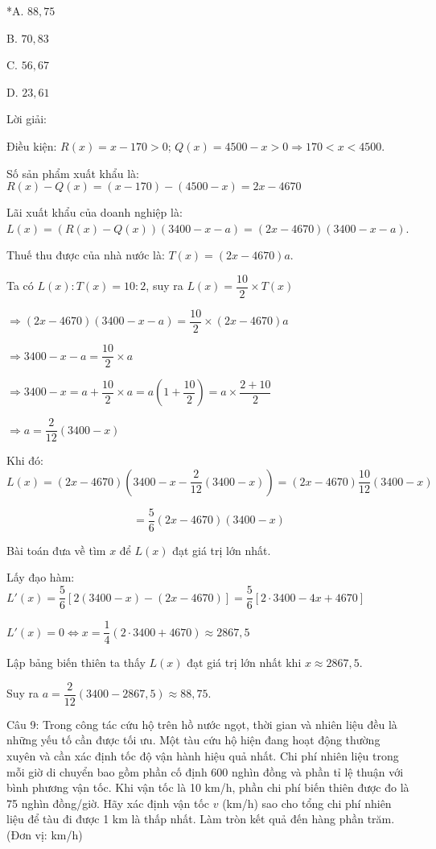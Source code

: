 \documentclass[a4paper,12pt]{article}
\begin{document}
*A. \(88,75\)

B. \(70,83\)

C. \(56,67\)

D. \(23,61\)

Lời giải:


Điều kiện: \(R(x) = x - 170 > 0\); \(Q(x) = 4500 - x > 0 \Rightarrow 170 < x < 4500\).

Số sản phẩm xuất khẩu là: \(R(x) - Q(x) = (x - 170) - (4500 - x) = 2x - 4670\)

Lãi xuất khẩu của doanh nghiệp là: \(L(x) = (R(x) - Q(x))(3400 - x - a) = (2x - 4670)(3400 - x - a)\).

Thuế thu được của nhà nước là: \(T(x) = (2x - 4670)a\).

Ta có \(L(x) : T(x) = 10 : 2\), suy ra \(L(x) = \dfrac{10}{2} \times T(x)\)

\(\Rightarrow (2x - 4670)(3400 - x - a) = \dfrac{10}{2} \times (2x - 4670)a\)

\(\Rightarrow 3400 - x - a = \dfrac{10}{2} \times a\)

\(\Rightarrow 3400 - x = a + \dfrac{10}{2} \times a = a\left(1 + \dfrac{10}{2}\right) = a \times \dfrac{2 + 10}{2}\)

\(\Rightarrow a = \dfrac{2}{12}(3400 - x)\)

Khi đó:
$$L(x) = (2x - 4670)\left(3400 - x - \dfrac{2}{12}(3400 - x)\right) = (2x - 4670) \dfrac{10}{12}(3400 - x)$$

$$= \dfrac{5}{6}(2x - 4670)(3400 - x)$$

Bài toán đưa về tìm \(x\) để \(L(x)\) đạt giá trị lớn nhất.

Lấy đạo hàm: \(L'(x) = \dfrac{5}{6}[2(3400 - x) - (2x - 4670)] = \dfrac{5}{6}[2 \cdot 3400 - 4x + 4670]\)

\(L'(x) = 0 \Leftrightarrow x = \dfrac{1}{4}(2 \cdot 3400 + 4670) \approx 2867,5\)

Lập bảng biến thiên ta thấy \(L(x)\) đạt giá trị lớn nhất khi \(x \approx 2867,5\).

Suy ra \(a = \dfrac{2}{12}(3400 - 2867,5) \approx 88,75\).




Câu 9: Trong công tác cứu hộ trên hồ nước ngọt, thời gian và nhiên liệu đều là những yếu tố cần được tối ưu. Một tàu cứu hộ hiện đang hoạt động thường xuyên và cần xác định tốc độ vận hành hiệu quả nhất. Chi phí nhiên liệu trong mỗi giờ di chuyển bao gồm phần cố định 600 nghìn đồng và phần tỉ lệ thuận với bình phương vận tốc. Khi vận tốc là 10 km/h, phần chi phí biến thiên được đo là 75 nghìn đồng/giờ. Hãy xác định vận tốc \(v\) (km/h) sao cho tổng chi phí nhiên liệu để tàu đi được 1 km là thấp nhất. Làm tròn kết quả đến hàng phần trăm. (Đơn vị: km/h)
\end{document}
